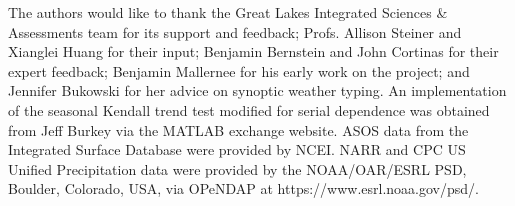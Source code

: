 \documentclass[twocol]{ametsoc}
\begin{document}


%
\acknowledgments
The authors would like to thank the Great Lakes Integrated Sciences \& Assessments team for its support and feedback; Profs. Allison Steiner and Xianglei Huang for their input; Benjamin Bernstein and John Cortinas for their expert feedback; Benjamin Mallernee for his early work on the project; and Jennifer Bukowski for her advice on synoptic weather typing. An implementation of the seasonal Kendall trend test modified for serial dependence was obtained from Jeff Burkey via the MATLAB exchange website. ASOS data from the Integrated Surface Database were provided by NCEI. NARR and CPC US Unified Precipitation data were provided by the NOAA/OAR/ESRL PSD, Boulder, Colorado, USA, via OPeNDAP at https://www.esrl.noaa.gov/psd/.  



\end{document}
